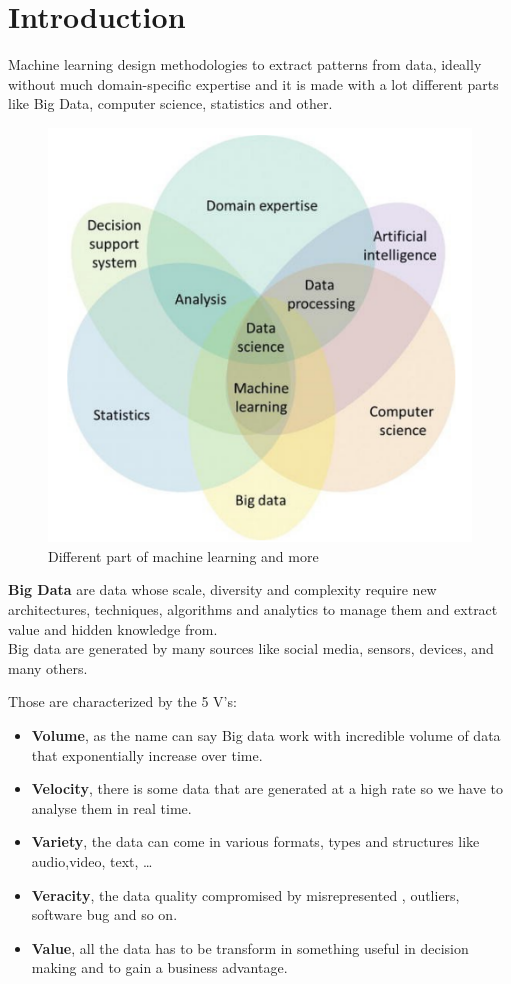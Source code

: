 \chapter{Introduction}
Machine learning design methodologies to extract patterns from data,
ideally without much domain-specific expertise and it is made with a lot
different parts like Big Data, computer science, statistics and other.
\begin{figure}[H]
    \centering
    \includegraphics[scale=0.5]{images/Introduction/Intro1.png}
    \caption{Different part of machine learning and more}
\end{figure}

\textbf{Big Data} are data whose scale, diversity and complexity require new
architectures, techniques, algorithms and analytics to manage them and
extract value and hidden knowledge from.\\
Big data are generated by many sources like social media, sensors, devices,
and many others.

Those are characterized by the 5 V's:
\begin{itemize}
    \item \textbf{Volume}, as the name can say Big data work with
      incredible volume of data that exponentially increase over time.
    \item \textbf{Velocity}, there is some data that are generated at a
      high rate so we have to analyse them in real time.
    \item \textbf{Variety}, the data can come in various formats, types and
      structures like audio,video, text, \ldots
    \item \textbf{Veracity}, the data quality compromised by misrepresented
      , outliers, software bug and so on.
    \item \textbf{Value}, all the data has to be transform in something
      useful in decision making and to gain a business advantage.
\end{itemize}

